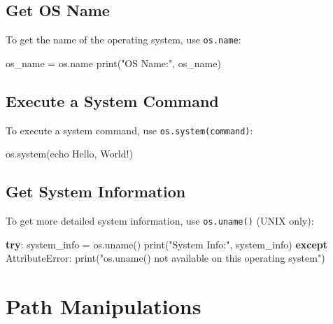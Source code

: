 \documentclass[
  letterpaper,
  DIV=11,
  numbers=noendperiod]{scrreprt}
\newenvironment{Shaded}{\begin{snugshade}}{\end{snugshade}}
\newcommand{\BuiltInTok}[1]{\textcolor[rgb]{0.00,0.23,0.31}{#1}}
\newcommand{\ControlFlowTok}[1]{\textcolor[rgb]{0.00,0.23,0.31}{\textbf{#1}}}
\newcommand{\NormalTok}[1]{\textcolor[rgb]{0.00,0.23,0.31}{#1}}
\newcommand{\OperatorTok}[1]{\textcolor[rgb]{0.37,0.37,0.37}{#1}}
\newcommand{\PreprocessorTok}[1]{\textcolor[rgb]{0.68,0.00,0.00}{#1}}
\newcommand{\StringTok}[1]{\textcolor[rgb]{0.13,0.47,0.30}{#1}}
\begin{document}
\subsection{Get OS Name}\label{get-os-name}

To get the name of the operating system, use \texttt{os.name}:

\begin{Shaded}
\begin{Highlighting}[]
\NormalTok{os\_name }\OperatorTok{=}\NormalTok{ os.name}
\BuiltInTok{print}\NormalTok{(}\StringTok{"OS Name:"}\NormalTok{, os\_name)}
\end{Highlighting}
\end{Shaded}

\subsection{Execute a System Command}\label{execute-a-system-command}

To execute a system command, use \texttt{os.system(command)}:

\begin{Shaded}
\begin{Highlighting}[]
\NormalTok{os.system(}\StringTok{\textquotesingle{}echo Hello, World!\textquotesingle{}}\NormalTok{)}
\end{Highlighting}
\end{Shaded}

\subsection{Get System Information}\label{get-system-information}

To get more detailed system information, use \texttt{os.uname()} (UNIX
only):

\begin{Shaded}
\begin{Highlighting}[]
\ControlFlowTok{try}\NormalTok{:}
\NormalTok{    system\_info }\OperatorTok{=}\NormalTok{ os.uname()}
    \BuiltInTok{print}\NormalTok{(}\StringTok{"System Info:"}\NormalTok{, system\_info)}
\ControlFlowTok{except} \PreprocessorTok{AttributeError}\NormalTok{:}
    \BuiltInTok{print}\NormalTok{(}\StringTok{"os.uname() not available on this operating system"}\NormalTok{)}
\end{Highlighting}
\end{Shaded}

\section{Path Manipulations}\label{path-manipulations}
\end{document}
